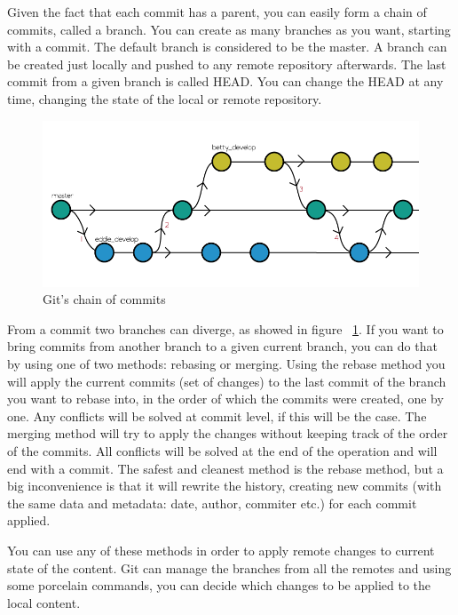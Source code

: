         Given the fact that each commit has a parent, you can easily form a chain of commits, called a branch. You can create as many branches as you want, starting with a commit. The default branch is considered to be the master. A branch can be created just locally and pushed to any remote repository afterwards. The last commit from a given branch is called HEAD.
        You can change the HEAD at any time, changing the state of the local or remote repository.
        
        \begin{figure}[h]
           \begin{center}
               \includegraphics[width=15cm]{theoretical/git_flow.png}
            \end{center}
            \label{fig:git-flow}
            \caption{Git's chain of commits \cite{Commits}}
        \end{figure}
        
        From a commit two branches can diverge, as showed in figure ~\ref{fig:git-flow}. If you want to bring commits from another branch to a given current branch, you can do that by using one of two methods: rebasing or merging. 
        Using the rebase method you will apply the current commits (set of changes) to the last commit of the branch you want to rebase into, in the order of which the commits were created, one by one. Any conflicts will be solved at commit level, if this will be the case. 
        The merging method will try to apply the changes without keeping track of the order of the commits. All conflicts will be solved at the end of the operation and will end with a commit. 
        The safest and cleanest method is the rebase method, but a big inconvenience is that it will rewrite the history, creating new commits (with the same data and metadata: date, author, commiter etc.) for each commit applied.
        
        You can use any of these methods in order to apply remote changes to current state of the content. Git can manage the branches from all the remotes and using some porcelain commands, you can decide which changes to be applied to the local content.
        
